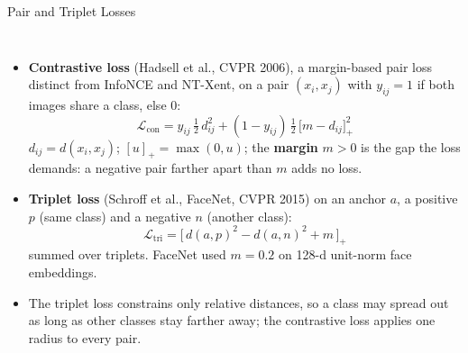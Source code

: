 \begin{frame}{Pair and Triplet Losses}
  \begin{columns}[T,onlytextwidth]
      \begin{itemize}\footnotesize\itemsep0.35em
        \item \textbf{Contrastive loss} (Hadsell et al., CVPR 2006), a margin-based pair loss distinct from InfoNCE and NT-Xent, on a pair $(x_i,x_j)$ with $y_{ij}=1$ if both images share a class, else 0:
        \[ \mathcal{L}_{\text{con}}=y_{ij}\,\tfrac{1}{2}\,d_{ij}^{2}+(1-y_{ij})\,\tfrac{1}{2}\,\big[m-d_{ij}\big]_+^{2} \]
        $d_{ij}=d(x_i,x_j)$; $[u]_+=\max(0,u)$; the \textbf{margin} $m>0$ is the gap the loss demands: a negative pair farther apart than $m$ adds no loss.
        \item \textbf{Triplet loss} (Schroff et al., FaceNet, CVPR 2015) on an anchor $a$, a positive $p$ (same class) and a negative $n$ (another class):
        \[ \mathcal{L}_{\text{tri}}=\big[\,d(a,p)^2-d(a,n)^2+m\,\big]_+ \]
        summed over triplets. FaceNet used $m=0.2$ on 128-d unit-norm face embeddings.
        \item The triplet loss constrains only relative distances, so a class may spread out as long as other classes stay farther away; the contrastive loss applies one radius to every pair.
      \end{itemize}
      \centering
      \vspace{0.4em}
\end{columns}
\end{frame}
